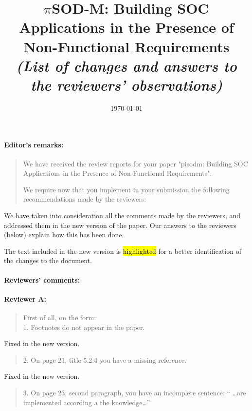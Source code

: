 \documentclass[12pt,a4wide]{article}
\title{$\pi$SOD-M: Building SOC Applications in the Presence of Non-Functional Requirements\\[3mm]
\textit{\large (List of changes and answers to the reviewers' observations)}}
\date{\today}
\begin{document}
\maketitle

\paragraph*{Editor's remarks:}
\begin{quotation}\sf\footnotesize

We have received the review reports for your paper "pisodm: Building SOC Applications in the Presence of Non-Functional Requirements". 

We require now that you implement in your submission the following recommendations made by the reviewers: 


\end{quotation}

\noindent 
We have taken into consideration all the comments made by the reviewers, and addressed  them in the new version of the paper. 
Our answers to the reviewers (below) explain how this has been done. 

The text included in the new version is \hl{highlighted} for a better identification of the changes to the document.

\paragraph*{Reviewers' comments:}

\paragraph*{Reviewer A:} 
\begin{quotation}\sf\footnotesize
\noindent 
First of all, on the form: \\
1.    Footnotes do not appear in the paper. 
\end{quotation}

\noindent 
Fixed in the new version.


\begin{quotation}\sf\footnotesize

2.    On page 21, title 5.2.4 you have a missing reference. 
\end{quotation}

\noindent 
Fixed in the new version.

\begin{quotation}\sf\footnotesize

3.    On page 23, second paragraph, you have an incomplete sentence: `` \dots are implemented according a the knowledge\dots ''
\end{quotation}
\end{document}
